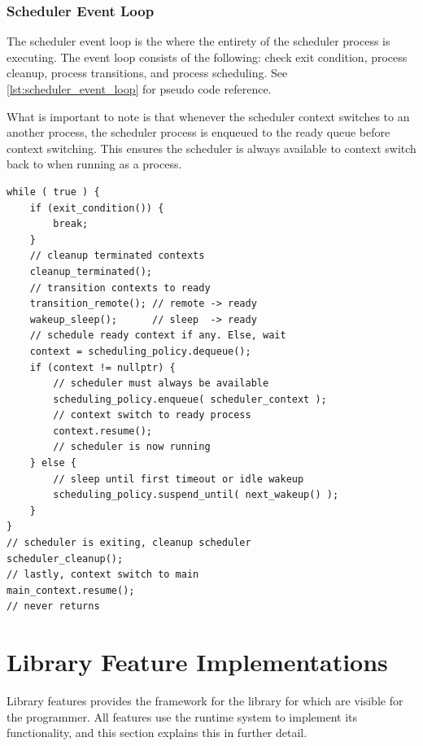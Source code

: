\FloatBarrier
\subsubsection{Scheduler Event Loop}


The scheduler event loop is the where the entirety of the scheduler process is executing. The event loop consists of the following: check exit condition, process cleanup, process transitions, and process scheduling. See \cref{lst:scheduler_event_loop} for pseudo code reference.

What is important to note is that whenever the scheduler context switches to an another process, the scheduler process is enqueued to the ready queue before context switching. This ensures the scheduler is always available to context switch back to when running as a process. 

\begin{lstfloat}
\begin{lstlisting}[caption={Scheduler event loop pseudo code.}, label={lst:scheduler_event_loop}, style={CustomC}, xleftmargin={2em}]
while ( true ) {
    if (exit_condition()) {
        break;
    }
    // cleanup terminated contexts
    cleanup_terminated();
    // transition contexts to ready
    transition_remote(); // remote -> ready
    wakeup_sleep();      // sleep  -> ready
    // schedule ready context if any. Else, wait
    context = scheduling_policy.dequeue();
    if (context != nullptr) {
        // scheduler must always be available
        scheduling_policy.enqueue( scheduler_context );
        // context switch to ready process
        context.resume();
        // scheduler is now running
    } else {
        // sleep until first timeout or idle wakeup
        scheduling_policy.suspend_until( next_wakeup() );
    }
}
// scheduler is exiting, cleanup scheduler
scheduler_cleanup();
// lastly, context switch to main
main_context.resume();
// never returns
\end{lstlisting}
\end{lstfloat}

\FloatBarrier
\section{Library Feature Implementations}

Library features provides the framework for the library for which are visible for the programmer. All features use the runtime system to implement its functionality, and this section explains this in further detail.


